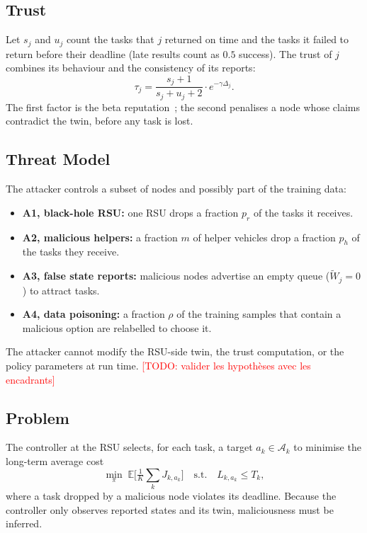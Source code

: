 \documentclass[journal]{IEEEtran}
\newcommand{\todo}[1]{\textcolor{red}{[TODO: #1]}}
\begin{document}
\subsection{Trust}
Let $s_j$ and $u_j$ count the tasks that $j$ returned on time and the tasks it failed to return before their deadline (late results count as $0.5$ success). The trust of $j$ combines its behaviour and the consistency of its reports:
\begin{equation}
\tau_j = \frac{s_j+1}{s_j+u_j+2}\cdot e^{-\gamma\Delta_j}.
\end{equation}
The first factor is the beta reputation~\cite{josang2002beta}; the second penalises a node whose claims contradict the twin, before any task is lost.

\subsection{Threat Model}
The attacker controls a subset of nodes and possibly part of the training data:
\begin{itemize}
\item \textbf{A1, black-hole RSU:} one RSU drops a fraction $p_r$ of the tasks it receives.
\item \textbf{A2, malicious helpers:} a fraction $m$ of helper vehicles drop a fraction $p_h$ of the tasks they receive.
\item \textbf{A3, false state reports:} malicious nodes advertise an empty queue ($\tilde{W}_j=0$) to attract tasks.
\item \textbf{A4, data poisoning:} a fraction $\rho$ of the training samples that contain a malicious option are relabelled to choose it.
\end{itemize}
The attacker cannot modify the RSU-side twin, the trust computation, or the policy parameters at run time. \todo{valider les hypothèses avec les encadrants}

\subsection{Problem}
The controller at the RSU selects, for each task, a target $a_k\in\mathcal{A}_k$ to minimise the long-term average cost
\begin{equation}
\min_{\pi}\; \mathbb{E}\Big[\tfrac{1}{K}\textstyle\sum_k J_{k,a_k}\Big]\quad \text{s.t.}\quad L_{k,a_k}\le T_k,
\end{equation}
where a task dropped by a malicious node violates its deadline. Because the controller only observes reported states and its twin, maliciousness must be inferred.
\end{document}
